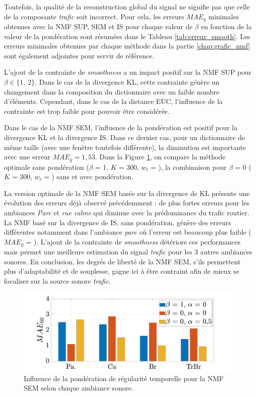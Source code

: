 Toutefois, la qualité de la reconstruction global du signal ne signifie pas que celle de la composante \textit{trafic} soit incorrect. Pour cela, les erreurs $MAE_g$ minimales obtenues avec la NMF SUP, SEM et IS pour chaque valeur de $\beta$ en fonction de la valeur de la pondération sont résumées dans le Tableau \ref{tab:erreur_smooth}. Les erreurs minimales obtenues par chaque méthode dans la partie \ref{chap:grafic_nmf} sont également adjointes pour servir de référence.

L'ajout de la contrainte de \textit{smoothness} a un impact positif sur la NMF SUP pour $\beta \in \lbrace 1,~2 \rbrace$. Dans le cas de la divergence KL, cette contrainte génère un changement dans la composition du dictionnaire avec un faible nombre d'éléments. Cependant, dans le cas de la distance EUC, l'influence de la contrainte est trop faible pour pouvoir être considérée.

Dans le cas de la NMF SEM, l'influence de la pondération est positif pour la divergence KL et la divergence IS. Dans ce dernier cas, pour un dictionnaire de même taille (avec une fenêtre toutefois différente), la diminution est importante avec une erreur $MAE_g = 1,53$. 
Dans la Figure \ref{fig:smoothMAE60}, on compare la méthode optimale sans pondération ($\beta$ = 1, $K$ = 300, $w_t$ = ), la combinaison pour $\beta$ = 0 ($K$ = 300, $w_t$ = ) sans et avec pondération. 

La version optimale de la NMF SEM basée sur la divergence de KL présente une évolution des erreurs déjà observé précédemment : de plus fortes erreurs pour les ambiances \textit{Parc} et \textit{rue calme} qui diminue avec la prédominance du trafic routier. 
La NMF basé sur la divergence de IS, sans pondération, génère des erreurs différentes notamment dans l'ambiance \textit{parc} où l'erreur est beaucoup plus faible ($MAE_g$ = ). L'ajout de la contrainte de \textit{smoothness} détériore ces performances mais permet une meilleure estimation du signal \textit{trafic} pour les 3 autres ambiances sonores.
En conclusion, les degrés de liberté de la NMF SEM, s'ils permettent plus d'adaptabilité et de souplesse, gagne ici à être contraint afin de mieux se focaliser sur la source sonore \textit{trafic}. 

\begin{figure}[h!]
\centering
\includegraphics[width=.9\linewidth]{./figures/resultats/grafic_smooth_bar.pdf}
\caption{Influence de la pondération de régularité temporelle pour la NMF SEM selon chaque ambiance sonore.}
\label{fig:smoothMAE60}
\end{figure}


